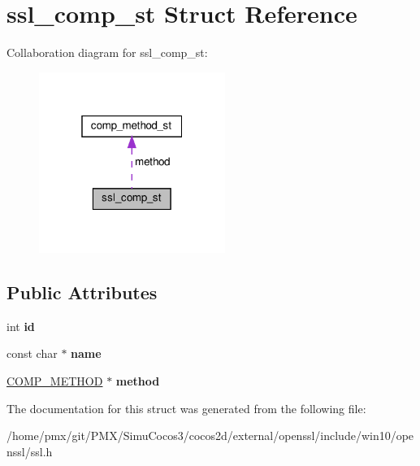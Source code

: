 \hypertarget{structssl__comp__st}{}\section{ssl\+\_\+comp\+\_\+st Struct Reference}
\label{structssl__comp__st}


Collaboration diagram for ssl\+\_\+comp\+\_\+st\+:
\nopagebreak
\begin{figure}[H]
\begin{center}
\leavevmode
\includegraphics[width=172pt]{structssl__comp__st__coll__graph}
\end{center}
\end{figure}
\subsection*{Public Attributes}
\begin{DoxyCompactItemize}
\item 
\mbox{\label{structssl__comp__st_aa0289c534fa9807fd873d0586c5e49aa}} 
int {\bfseries id}
\item 
\mbox{\label{structssl__comp__st_a5f5f77d06eefedaaa25bab3779a37c7b}} 
const char $\ast$ {\bfseries name}
\item 
\mbox{\label{structssl__comp__st_a0db9c4890962ace222be72135c08b26c}} 
\hyperlink{structcomp__method__st}{C\+O\+M\+P\+\_\+\+M\+E\+T\+H\+OD} $\ast$ {\bfseries method}
\end{DoxyCompactItemize}


The documentation for this struct was generated from the following file\+:\begin{DoxyCompactItemize}
\item 
/home/pmx/git/\+P\+M\+X/\+Simu\+Cocos3/cocos2d/external/openssl/include/win10/openssl/ssl.\+h\end{DoxyCompactItemize}
